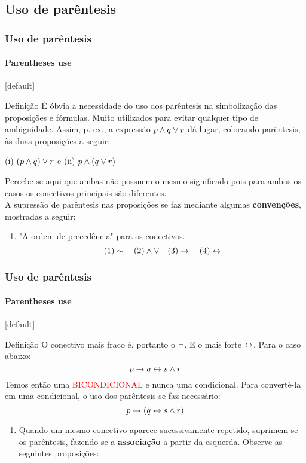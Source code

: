 \subsection{Uso de parêntesis}
%
\begin{frame}[t]
    \frametitle{Uso de parêntesis}
    \framesubtitle{Parentheses use}
    [default]
    \begin{block}{Definição}
        \indent É óbvia a necessidade do uso dos parêntesis na simbolização das proposições e fórmulas. Muito utilizados para evitar qualquer tipo de ambiguidade. Assim, p. ex., a expressão $p \land q \lor r$ dá lugar, colocando parêntesis, às duas proposições a seguir:
        
        \begin{center}
            (i) $(p \land q) \lor r$ \quad e \quad (ii) $p \land (q \lor r)$
        \end{center}

        \indent Percebe-se aqui que ambas não possuem o mesmo significado pois para ambos os casos os conectivos principais são diferentes. \\ [4pt]
        \indent A supressão de parêntesis nas proposições se faz mediante algumas \textbf{convenções}, mostradas a seguir:
        \begin{enumerate}[\bf I. ]
            \item "A ordem de precedência" para os conectivos.
            \vspace{-2mm}
            $$(1) \sim  \quad (2) \land \lor  \quad (3) \rightarrow \quad (4) \leftrightarrow$$
        \end{enumerate} 
    \end{block}
\end{frame}
%
\begin{frame}[t]
    \frametitle{Uso de parêntesis}
    \framesubtitle{Parentheses use}
    [default]
    \begin{block}{Definição}
        \indent O conectivo mais fraco é, portanto o $\lnot$. E o mais forte $\leftrightarrow$. Para o caso abaixo:
        $$ p \rightarrow q \leftrightarrow s \land r $$
        \indent Temos então uma \textcolor{red}{BICONDICIONAL} e nunca uma condicional. Para convertê-la em uma condicional, o uso dos parêntesis se faz necessário:
        $$ p \rightarrow (q \leftrightarrow s \land r) $$
        \begin{enumerate}[\bf II. ]
            \item Quando um mesmo conectivo aparece sucessivamente repetido, suprimem-se os parêntesis, fazendo-se a \textbf{associação} a partir da esquerda. Observe as seguintes proposições:
        \end{enumerate} 
    \end{block}
\end{frame}
